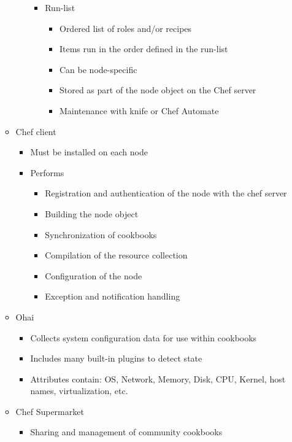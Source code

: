 \begin{itemize}
\begin{itemize}
\begin{itemize}
\begin{itemize}
								\item Run-list
									\begin{itemize}
										\item Ordered list of roles and/or recipes
										\item Items run in the order defined in the run-list
										\item Can be node-specific
										\item Stored as part of the node object on the Chef server
										\item Maintenance with knife or Chef Automate
									\end{itemize}
							\end{itemize}
					\end{itemize}
				\item Chef client
					\begin{itemize}
						\item Must be installed on each node
						\item Performs
							\begin{itemize}
								\item Registration and authentication of the node with the chef server
								\item Building the node object
								\item Synchronization of cookbooks
								\item Compilation of the resource collection
								\item Configuration of the node
								\item Exception and notification handling
							\end{itemize}
					\end{itemize}
				\item Ohai
					\begin{itemize}
						\item Collects system configuration data for use within cookbooks
						\item Includes many built-in plugins to detect state
						\item Attributes contain: OS, Network, Memory, Disk, CPU, Kernel, host names, virtualization, etc.
					\end{itemize}
				\item Chef Supermarket
				\begin{itemize}
					\item Sharing and management of community cookbooks
				\end{itemize}
			\end{itemize}

\end{itemize}

